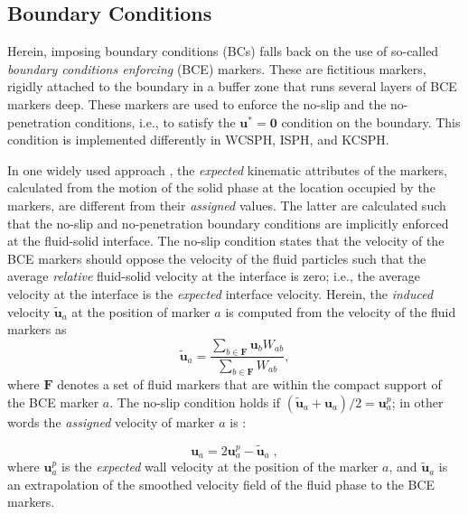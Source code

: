 \subsection{Boundary Conditions}
\label{sec:BC}
Herein, imposing boundary conditions (BCs) falls back on the use of so-called {\textit{boundary conditions enforcing}} (BCE) markers. These are fictitious markers, rigidly attached to the boundary in a buffer zone that runs several layers of BCE markers deep. These markers are used to enforce the no-slip and the no-penetration conditions, i.e., to satisfy the $\mathbf{u}^*= \mathbf{0}$ condition on the boundary. This condition is implemented differently in WCSPH, ISPH, and KCSPH.


In one widely used approach \cite{Adami2012}, the \textit{expected} kinematic attributes of the markers, calculated from the motion of the solid phase at the location occupied by the markers, are different from their \textit{assigned} values. The latter are calculated such that the no-slip and no-penetration boundary conditions are implicitly enforced at the fluid-solid interface. The no-slip condition states that the velocity of the BCE markers should oppose the velocity of the fluid particles such that the average \textit{relative} fluid-solid velocity at the interface is zero; i.e., the average velocity at the interface is the \textit{expected} interface velocity. Herein, the \textit{induced} velocity $ \tilde{\mathbf{u}}_a$ at the position of marker $a$ is computed from the velocity of the fluid markers as
\begin{equation}\label{eq:BCE_extrapolation}
\tilde{\mathbf{u}}_a = \frac{\sum\limits_{b \in \mathbf{F}} {\mathbf{u}_b W_{ab}}}{\sum\limits_{b \in \mathbf{F}} {W_{ab}}},
\end{equation}
where $\mathbf{F}$ denotes a set of fluid markers that are within the compact support of the BCE marker $a$. The no-slip condition holds if $(\tilde{\mathbf{u}}_a +\mathbf{u}_a)/2=\mathbf{u}_a^p$; in other words the \textit{assigned} velocity of marker $a$ is \cite{Adami2012}:

\begin{equation} \label{eq:vBCE_Adami}
\mathbf{u}_a = 2 \mathbf{u}^{p}_a - \tilde{\mathbf{u}}_a \; ,
\end{equation}
where $\mathbf{u}^{p}_a$ is the \textit{expected} wall velocity at the position of the marker $a$, and $\tilde{\mathbf{u}}_a$ is an extrapolation of the smoothed velocity field of the fluid phase to the BCE markers.


